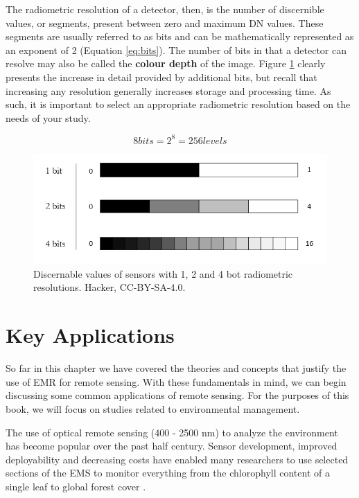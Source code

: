 \documentclass[
]{book}
\begin{document}
The radiometric resolution of a detector, then, is the number of discernible values, or segments, present between zero and maximum DN values. These segments are usually referred to as bits and can be mathematically represented as an exponent of 2 (Equation \eqref{eq:bits}). The number of bits in that a detector can resolve may also be called the \textbf{colour depth} of the image. Figure \ref{fig:11-radiometric} clearly presents the increase in detail provided by additional bits, but recall that increasing any resolution generally increases storage and processing time. As such, it is important to select an appropriate radiometric resolution based on the needs of your study.

\begin{equation}
8 bits = 2^8 = 256 levels
\label{eq:bits}
\end{equation}

\begin{figure}
\includegraphics[width=9.46in]{images/11-radiometric-res} \caption{Discernable values of sensors with 1, 2 and 4 bot radiometric resolutions. Hacker, CC-BY-SA-4.0.}\label{fig:11-radiometric}
\end{figure}

\section{Key Applications}\label{key-applications}

So far in this chapter we have covered the theories and concepts that justify the use of EMR for remote sensing. With these fundamentals in mind, we can begin discussing some common applications of remote sensing. For the purposes of this book, we will focus on studies related to environmental management.

The use of optical remote sensing (400 - 2500 nm) to analyze the environment has become popular over the past half century. Sensor development, improved deployability and decreasing costs have enabled many researchers to use selected sections of the EMS to monitor everything from the chlorophyll content of a single leaf \citep{curran_remote_1989} to global forest cover \citep{hansen_high-resolution_2013}.
\end{document}
